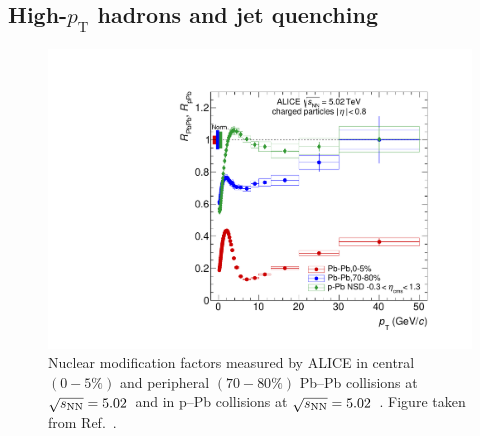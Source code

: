 \subsection{\texorpdfstring{High-$p_\mathrm{T}$ hadrons and jet quenching}{High-pT hadrons and jet quenching}}\label{sec:high_pt}
\begin{figure}[htb]
  \centering
  \includegraphics[width=0.7\linewidth]{Figures/Chapter 1/rAArpPb.pdf}
  \caption{Nuclear modification factors measured by ALICE in central $(0-5\%)$ and peripheral $(70-80\%)$ Pb--Pb collisions at $\sqrt{s_\mathrm{NN}}=5.02$~\tev and in p--Pb collisions at $\sqrt{s_\mathrm{NN}} = 5.02$~\tev. Figure taken from Ref.~\cite{ALICE:2018vuu}.}
  \label{fig:RAA}
\end{figure}

